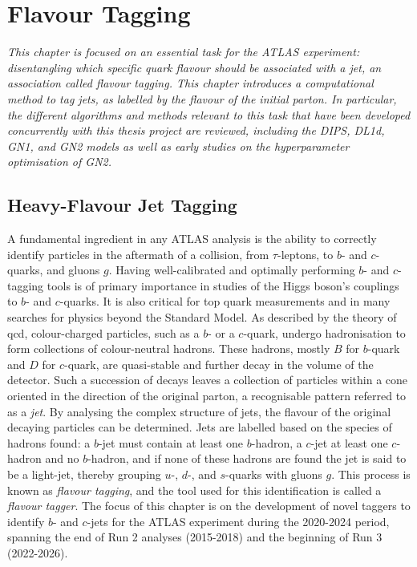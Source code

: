 \chapter{\color{oxfordblue} Flavour Tagging}\label{chap-ftag}
\ChapFrame

\textit{
This chapter is focused on an essential task for the ATLAS experiment: disentangling which specific quark flavour should be associated with a jet, an association called flavour tagging. This chapter introduces a computational method to tag jets, as labelled by the flavour of the initial parton. In particular, the different algorithms and methods relevant to this task that have been developed concurrently with this thesis project are reviewed, including the DIPS, DL1d, GN1, and GN2 models as well as early studies on the hyperparameter optimisation of GN2.
}

\section{Heavy-Flavour Jet Tagging}
A fundamental ingredient in any ATLAS analysis is the ability to correctly identify particles in the aftermath of a collision, from $\tau$-leptons, to $b$- and $c$-quarks, and gluons $g$. Having well-calibrated and optimally performing $b$- and $c$-tagging tools is of primary importance in studies of the Higgs boson's couplings to $b$- and $c$-quarks. It is also critical for top quark measurements and in many searches for physics beyond the Standard Model. As described by the theory of \gls{qcd}, colour-charged particles, such as a $b$- or a $c$-quark, undergo hadronisation to form collections of colour-neutral hadrons. These hadrons, mostly $B$ for $b$-quark and $D$ for $c$-quark, are quasi-stable and further decay in the volume of the detector. Such a succession of decays leaves a collection of particles within a cone oriented in the direction of the original parton, a recognisable pattern referred to as a \textit{jet}. By analysing the complex structure of jets, the flavour of the original decaying particles can be determined. Jets are labelled based on the species of hadrons found: a $b$-jet must contain at least one $b$-hadron, a $c$-jet at least one $c$-hadron and no $b$-hadron, and if none of these hadrons are found the jet is said to be a light-jet, thereby grouping $u$-, $d$-, and $s$-quarks with gluons $g$. This process is known as \textit{flavour tagging}, and the tool used for this identification is called a \textit{flavour tagger}. The focus of this chapter is on the development of novel taggers to identify $b$- and $c$-jets for the ATLAS experiment during the 2020-2024 period, spanning the end of Run 2 analyses (2015-2018) and the beginning of Run 3 (2022-2026). 

